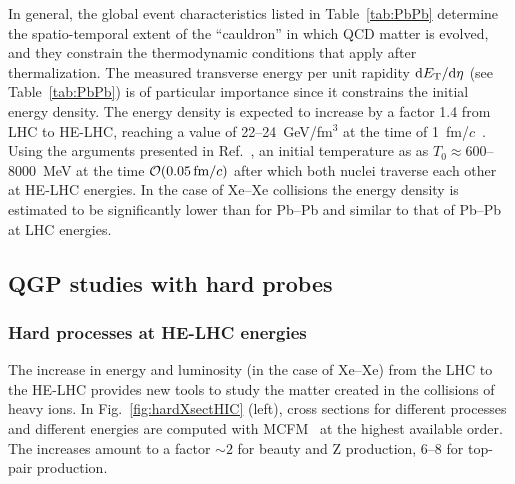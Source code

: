 \documentclass[../report.tex]{subfiles}
\begin{document}
In general, the global event characteristics listed in Table~\ref{tab:PbPb} determine the spatio-temporal extent of the ``cauldron'' in which QCD matter is evolved, and they
constrain the thermodynamic conditions that apply after thermalization. The measured transverse energy per unit rapidity ${\rm d}E_{\rm T}/{\rm d}\eta$ (see Table~\ref{tab:PbPb})
is of particular importance since it constrains the initial energy density. 
The energy density is expected to increase by a factor 1.4 from LHC to HE-LHC, reaching a value of 22--24~GeV/fm$^3$ at the time of 1~fm/$c$~\cite{Dainese:2016gch}. 
Using the arguments presented in Ref.~\cite{Dainese:2016gch}, an initial temperature as 
as $T_0\approx 600$--$8000$~MeV at the time $\mathcal{O}(0.05\, {\rm fm}/c)$ after which both nuclei traverse each other at HE-LHC energies.
In the case of Xe--Xe collisions the energy density is estimated to be significantly lower than for Pb--Pb and similar to that of Pb--Pb at LHC energies.


\subsection{QGP studies with hard probes}
\label{sec:HE_hardprobes}


\subsubsection{Hard processes at HE-LHC energies}
\label{sec:HE_xsections}

The increase in energy and luminosity (in the case of Xe--Xe) from the LHC to the HE-LHC provides new tools to study the matter created in the collisions of heavy ions.
In Fig.~\ref{fig:hardXsectHIC} (left), cross sections for different processes
and different energies are computed with  MCFM~\cite{Campbell:2010ff}
at the highest available order. The increases amount to a factor
$\sim 2$ for beauty and Z production, 6--8 for top-pair production. 
\end{document}
